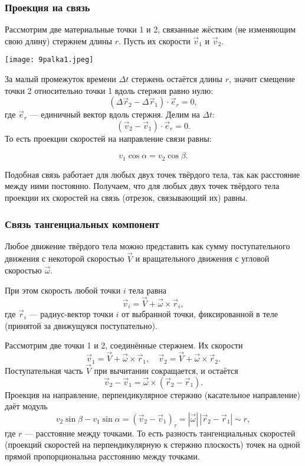\documentclass[12pt, a4paper]{article}%
\begin{document}
\subsubsection*{Проекция на связь}
Рассмотрим две материальные точки 1 и 2, связанные жёстким (не изменяющим свою длину)
стержнем длины $r$. Пусть их скорости $\vec v_1$ и $\vec v_2$.

\begin{center}
\texttt{[image: 9palka1.jpeg]}
\label{fig:mpr}
\end{center}


За малый промежуток времени $\Delta t$ стержень остаётся длины $r$, значит смещение точки 2 относительно точки 1 вдоль стержня равно нулю:
\[
(\Delta\vec r_2 - \Delta\vec r_1)\cdot\vec e_r = 0,
\]
где $\vec e_r$ — единичный вектор вдоль стержня. Делим на $\Delta t$:
\[
(\vec v_2 - \vec v_1)\cdot\vec e_r = 0.
\]
То есть проекции скоростей на направление связи равны:

\[
v_1\cos\alpha = v_2\cos\beta.
\]

Подобная связь работает для любых двух точек твёрдого тела, так как расстояние между ними постоянно. Получаем, что для любых двух точек твёрдого тела проекции их скоростей на связь (отрезок, связывающий их) равны.

\subsubsection*{Связь тангенциальных компонент}
Любое движение твёрдого тела можно представить как сумму поступательного движения с некоторой скоростью $\vec V$ и вращательного движения с угловой скоростью $\vec\omega$.  

При этом скорость любой точки $i$ тела равна  
\[
\vec v_i = \vec V + \vec\omega \times \vec r_i,
\]
где $\vec r_i$ — радиус-вектор точки $i$ от выбранной точки, фиксированной в теле (принятой за движущуяся поступательно).  

Рассмотрим две точки 1 и 2, соединённые стержнем. Их скорости  
\[
\vec v_1 = \vec V + \vec\omega \times \vec r_1,\quad
\vec v_2 = \vec V + \vec\omega \times \vec r_2.
\]
Поступательная часть $\vec V$ при вычитании сокращается, и остаётся  
\[
\vec v_2 - \vec v_1 = \vec\omega \times (\vec r_2 - \vec r_1).
\]
Проекция на направление, перпендикулярное стержню (касательное направление) даёт модуль  
\[
v_2\sin\beta - v_1\sin\alpha = (\vec v_2 - \vec v_1)_\tau = |\vec\omega|\,|\vec r_2 - \vec r_1| \sim r,
\]
где $r$ — расстояние между точками. То есть разность тангенциальных скоростей
(проекций скоростей на перпендикулярную к стержню плоскость) точек на одной прямой 
пропорциональна расстоянию между точками.
\end{document}
